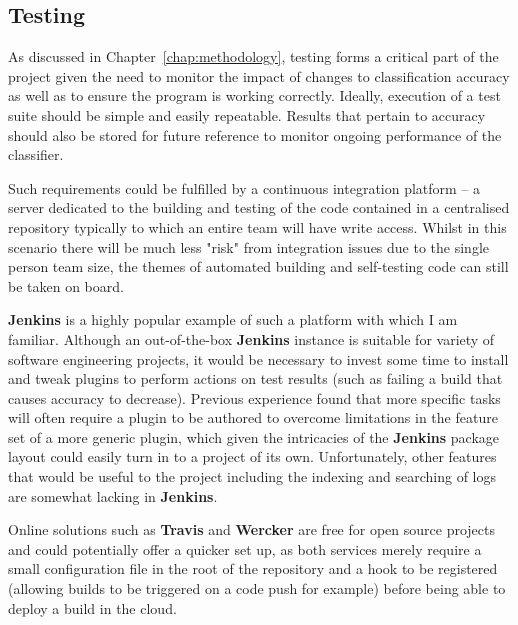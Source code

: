\subsection{Testing}

As discussed in Chapter~\ref{chap:methodology}, testing forms a critical part of
the project given the need to monitor the impact of changes to classification
accuracy as well as to ensure the program is working correctly. Ideally,
execution of a test suite should be simple and easily repeatable. Results that
pertain to accuracy should also be stored for future reference to monitor
ongoing performance of the classifier.

Such requirements could be fulfilled by a continuous integration platform -- a
server dedicated to the building and testing of the code contained in a
centralised repository typically to which an entire team will have write
access\citep{fowler-ci}. Whilst in this scenario there will be much less "risk"
from integration issues due to the single person team size, the themes of
automated building and self-testing code can still be taken on board.

\textbf{Jenkins}\citep{Jenkins} is a highly popular\cite{jenkins-stats} example
of such a platform with which I am familiar. Although an out-of-the-box
\textbf{Jenkins} instance is suitable for variety of software engineering
projects, it would be necessary to invest some time to install and tweak plugins
to perform actions on test results (such as failing a build that causes accuracy
to decrease).  Previous experience found that more specific tasks will often
require a plugin to be authored to overcome limitations in the feature set of a
more generic plugin, which given the intricacies of the \textbf{Jenkins} package
layout could easily turn in to a project of its own. Unfortunately, other
features that would be useful to the project including the indexing and
searching of logs are somewhat lacking in \textbf{Jenkins}.

Online solutions such as \textbf{Travis}\citep{travis-ci} and
\textbf{Wercker}\citep{wercker} are free for open source projects and could
potentially offer a quicker set up, as both services merely require a small
configuration file in the root of the repository and a hook to be registered
(allowing builds to be triggered on a code push for example) before being able
to deploy a build in the cloud.

